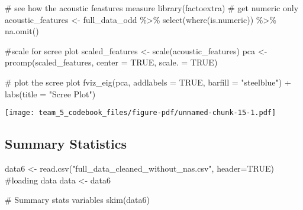 \documentclass[
  letterpaper,
  DIV=11,
  numbers=noendperiod]{scrartcl}
\newenvironment{Shaded}{\begin{snugshade}}{\end{snugshade}}
\newcommand{\AttributeTok}[1]{\textcolor[rgb]{0.40,0.45,0.13}{#1}}
\newcommand{\CommentTok}[1]{\textcolor[rgb]{0.37,0.37,0.37}{#1}}
\newcommand{\ConstantTok}[1]{\textcolor[rgb]{0.56,0.35,0.01}{#1}}
\newcommand{\FunctionTok}[1]{\textcolor[rgb]{0.28,0.35,0.67}{#1}}
\newcommand{\NormalTok}[1]{\textcolor[rgb]{0.00,0.23,0.31}{#1}}
\newcommand{\OtherTok}[1]{\textcolor[rgb]{0.00,0.23,0.31}{#1}}
\newcommand{\SpecialCharTok}[1]{\textcolor[rgb]{0.37,0.37,0.37}{#1}}
\newcommand{\StringTok}[1]{\textcolor[rgb]{0.13,0.47,0.30}{#1}}
\begin{document}
\begin{Shaded}
\begin{Highlighting}[]
\CommentTok{\# see how the acoustic feastures measure}
\FunctionTok{library}\NormalTok{(factoextra)}
\CommentTok{\# get numeric only}
\NormalTok{acoustic\_features }\OtherTok{\textless{}{-}}\NormalTok{ full\_data\_odd }\SpecialCharTok{\%\textgreater{}\%}
  \FunctionTok{select}\NormalTok{(}\FunctionTok{where}\NormalTok{(is.numeric)) }\SpecialCharTok{\%\textgreater{}\%}
  \FunctionTok{na.omit}\NormalTok{()  }

\CommentTok{\#scale for scree plot}
\NormalTok{scaled\_features }\OtherTok{\textless{}{-}} \FunctionTok{scale}\NormalTok{(acoustic\_features)}
\NormalTok{pca }\OtherTok{\textless{}{-}} \FunctionTok{prcomp}\NormalTok{(scaled\_features, }\AttributeTok{center =} \ConstantTok{TRUE}\NormalTok{, }\AttributeTok{scale. =} \ConstantTok{TRUE}\NormalTok{)}

\CommentTok{\# plot the scree plot}
\FunctionTok{fviz\_eig}\NormalTok{(pca, }\AttributeTok{addlabels =} \ConstantTok{TRUE}\NormalTok{, }\AttributeTok{barfill =} \StringTok{"steelblue"}\NormalTok{) }\SpecialCharTok{+}
  \FunctionTok{labs}\NormalTok{(}\AttributeTok{title =} \StringTok{"Scree Plot"}\NormalTok{)}
\end{Highlighting}
\end{Shaded}

\begin{center}
\texttt{[image: team\_5\_codebook\_files/figure-pdf/unnamed-chunk-15-1.pdf]}
\end{center}

\subsection{Summary Statistics}\label{summary-statistics}

\begin{Shaded}
\begin{Highlighting}[]
\NormalTok{data6 }\OtherTok{\textless{}{-}} \FunctionTok{read.csv}\NormalTok{(}\StringTok{"full\_data\_cleaned\_without\_nas.csv"}\NormalTok{, }\AttributeTok{header=}\ConstantTok{TRUE}\NormalTok{) }\CommentTok{\#loading data}
\NormalTok{data }\OtherTok{\textless{}{-}}\NormalTok{ data6}

\CommentTok{\# Summary stats variables}
\FunctionTok{skim}\NormalTok{(data6)}
\end{Highlighting}
\end{Shaded}
\end{document}
